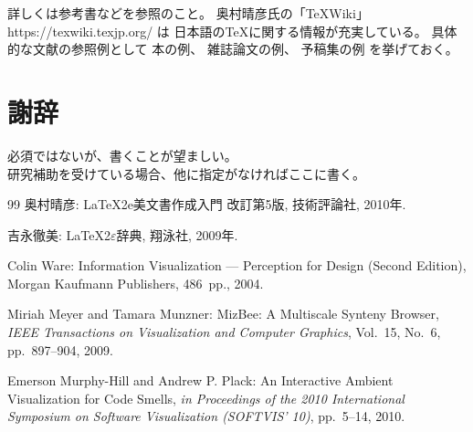 \documentclass[a4paper,11pt]{jreport}
\begin{document}
詳しくは参考書\cite{okumura2010,yoshinaga2009}などを参照のこと。
奥村晴彦氏の「\TeX Wiki」 https://texwiki.texjp.org/ は
日本語の\TeX に関する情報が充実している。
具体的な文献の参照例として
本の例\cite{ware2004}、
雑誌論文の例\cite{meyer2009}、
予稿集の例\cite{hill2010}
を挙げておく。

\chapter*{謝辞}

必須ではないが、書くことが望ましい。
\\
研究補助を受けている場合、他に指定がなければここに書く。

\newpage

\renewcommand{\bibname}{参考文献}

%
%

\begin{thebibliography}{99}
奥村晴彦: 
LaTeX2e美文書作成入門 改訂第5版, 
技術評論社, 2010年.	%

吉永徹美: 
LaTeX2$\varepsilon$辞典, 
翔泳社, 2009年.		%

Colin Ware:
Information Visualization --- Perception for Design (Second Edition), 
Morgan Kaufmann Publishers, 486~pp., 2004.

Miriah Meyer and Tamara Munzner:
MizBee: A Multiscale Synteny Browser, 
{\it IEEE Transactions on Visualization and Computer Graphics},
Vol.~15, No.~6, pp.~897--904, 2009.

Emerson Murphy-Hill and Andrew P. Plack: 
An Interactive Ambient Visualization for Code Smells, 
{\it in Proceedings of the 2010 International Symposium on Software Visualization (SOFTVIS' 10)},
pp.~5--14, 2010.

\end{thebibliography}
\end{document}

